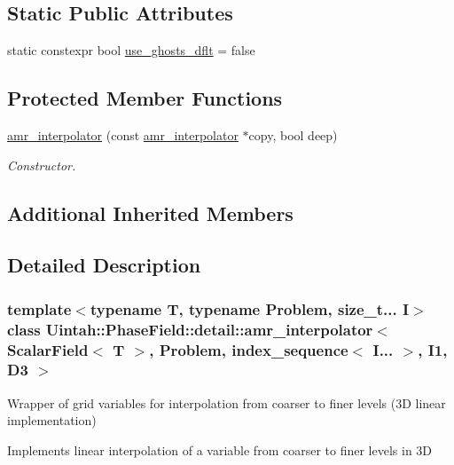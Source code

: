 \subsection*{Static Public Attributes}
\begin{DoxyCompactItemize}
\item 
static constexpr bool \hyperlink{classUintah_1_1PhaseField_1_1detail_1_1amr__interpolator_3_01ScalarField_3_01T_01_4_00_01Problemdf68628a6010a1e1526666730125c372_ac8949b5e1e12de5843d579bed1556ddb}{use\+\_\+ghosts\+\_\+dflt} = false
\end{DoxyCompactItemize}
\subsection*{Protected Member Functions}
\begin{DoxyCompactItemize}
\item 
\hyperlink{classUintah_1_1PhaseField_1_1detail_1_1amr__interpolator_3_01ScalarField_3_01T_01_4_00_01Problemdf68628a6010a1e1526666730125c372_a979f58156a77c56eeff8e548f8886dd3}{amr\+\_\+interpolator} (const \hyperlink{classUintah_1_1PhaseField_1_1detail_1_1amr__interpolator}{amr\+\_\+interpolator} $\ast$copy, bool deep)
\begin{DoxyCompactList}\small\item\em Constructor. \end{DoxyCompactList}\end{DoxyCompactItemize}
\subsection*{Additional Inherited Members}


\subsection{Detailed Description}
\subsubsection*{template$<$typename T, typename Problem, size\+\_\+t... I$>$\newline
class Uintah\+::\+Phase\+Field\+::detail\+::amr\+\_\+interpolator$<$ Scalar\+Field$<$ T $>$, Problem, index\+\_\+sequence$<$ I... $>$, I1, D3 $>$}

Wrapper of grid variables for interpolation from coarser to finer levels (3D linear implementation) 

Implements linear interpolation of a variable from coarser to finer levels in 3D

